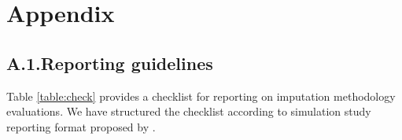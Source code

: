 \documentclass[bimj,fleqn]{w-art}
\begin{document}

\newpage

\section*{Appendix}

\subsection*{A.1.\enspace Reporting guidelines}

Table \ref{table:check} provides a checklist for reporting on imputation methodology evaluations. We have structured the checklist according to simulation study reporting format proposed by \citet{morr18}.  
\end{document}
